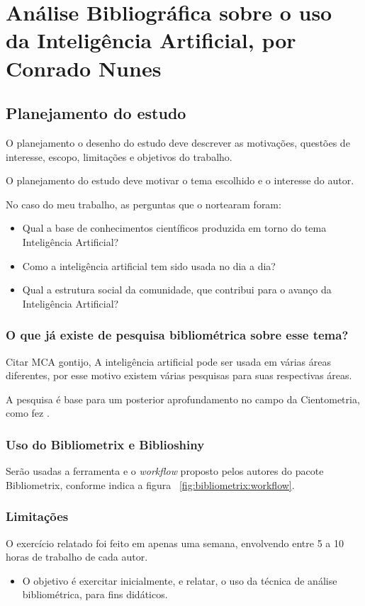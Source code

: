 \chapter{Análise Bibliográfica sobre o uso da Inteligência Artificial, por Conrado Nunes\label{chap:bibliometria:Conras21}}

\section{Planejamento do estudo}
O planejamento o  desenho do estudo deve descrever as motivações, questões de interesse, escopo, limitações e objetivos do trabalho.

O planejamento do estudo deve motivar o tema escolhido e o interesse do autor.

No caso do meu trabalho, as perguntas que o nortearam foram:
\begin{itemize}
    \item Qual a base de conhecimentos científicos produzida em torno do tema Inteligência Artificial? 
    \item Como a inteligência artificial tem sido usada no dia a dia? 
    \item Qual a estrutura social da comunidade, que contribui para o avanço da Inteligência Artificial?
\end{itemize}

\subsection{O que já existe de pesquisa bibliométrica sobre esse tema?}

Citar MCA gontijo, A inteligência artificial pode ser usada em várias áreas diferentes, por esse motivo existem várias pesquisas para suas respectivas áreas.

A pesquisa é base para um posterior aprofundamento no campo da Cientometria, como fez \cite{chavalarias_whats_2017}.

\subsection{Uso do Bibliometrix e Biblioshiny}
Serão usadas a ferramenta e o \textit{workflow} proposto pelos autores do pacote Bibliometrix, conforme indica a figura ~\ref{fig:bibliometrix:workflow}.

\subsection{Limitações} O exercício relatado foi feito em apenas uma semana, envolvendo entre 5 a 10 horas de trabalho de cada autor.


\begin{itemize}
\item O objetivo é exercitar inicialmente, e relatar, o uso da técnica de análise bibliométrica, para fins didáticos.
\end{itemize}